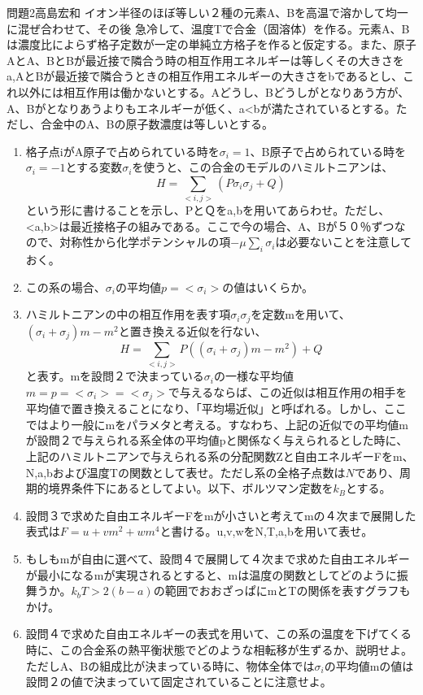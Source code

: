 \documentclass[fleqn]{jbook}
\begin{document}
\begin{question}{問題2}{高島宏和}
イオン半径のほぼ等しい２種の元素A、Bを高温で溶かして均一に混ぜ合わせて、その後
急冷して、温度Tで合金（固溶体）を作る。元素A、Bは濃度比によらず格子定数が一定の単純立方格子を作ると仮定する。また、原子AとA、BとBが最近接で隣合う時の相互作用エネルギーは等しくその大きさをa,AとBが最近接で隣合うときの相互作用エネルギーの大きさをbであるとし、これ以外には相互作用は働かないとする。Aどうし、Bどうしがとなりあう方が、A、Bがとなりあうよりもエネルギーが低く、a<bが満たされているとする。ただし、合金中のA、Bの原子数濃度は等しいとする。
\begin{enumerate}
\item 格子点iがA原子で占められている時を$\sigma_i=1$、B原子で占められている時を$\sigma_i=-1$とする変数$\sigma_i$を使うと、この合金のモデルのハミルトニアンは、
\begin{equation}
H=\sum _{<i,j>}{ (P \sigma_i \sigma_j +Q)}
\end{equation}
という形に書けることを示し、PとＱをa,bを用いてあらわせ。ただし、<a,b>は最近接格子の組みである。ここで今の場合、A、Bが５０％ずつなので、対称性から化学ポテンシャルの項$-\mu \sum _i \sigma_i$は必要ないことを注意しておく。
\item この系の場合、$\sigma_i$の平均値$p=< \sigma_i >$の値はいくらか。
\item ハミルトニアンの中の相互作用を表す項$ \sigma_i \sigma_j$を定数mを用いて、$( \sigma_i +\sigma_j)m-m^2$と置き換える近似を行ない、
\begin{equation}
H=\sum _{<i,j>} { P((\sigma_i+\sigma_j)m-m^2)+Q}
\end{equation}
と表す。mを設問２で決まっている$ \sigma_i$の一様な平均値$m=p=<\sigma_i>=<\sigma_j>$で与えるならば、この近似は相互作用の相手を平均値で置き換えることになり、「平均場近似」と呼ばれる。しかし、ここではより一般にmをパラメタと考える。すなわち、上記の近似での平均値mが設問２で与えられる系全体の平均値pと関係なく与えられるとした時に、上記のハミルトニアンで与えられる系の分配関数Zと自由エネルギーFをm、N,a,bおよび温度Tの関数として表せ。ただし系の全格子点数は$N$であり、周期的境界条件下にあるとしてよい。以下、ボルツマン定数を$k_B$とする。
\item 設問３で求めた自由エネルギーFをmが小さいと考えてmの４次まで展開した表式は$F=u+vm^2+wm^4$と書ける。u,v,wをN,T,a,bを用いて表せ。
\item もしもmが自由に選べて、設問４で展開して４次まで求めた自由エネルギーが最小になるmが実現されるとすると、mは温度の関数としてどのように振舞うか。$k_b T>2(b-a)$の範囲でおおざっぱにmとTの関係を表すグラフもかけ。
\item 設問４で求めた自由エネルギーの表式を用いて、この系の温度を下げてくる時に、この合金系の熱平衡状態でどのような相転移が生ずるか、説明せよ。ただしA、Bの組成比が決まっている時に、物体全体では$ \sigma_i$の平均値mの値は設問２の値で決まっていて固定されていることに注意せよ。
\end{enumerate}
\end{question}
\end{document}
